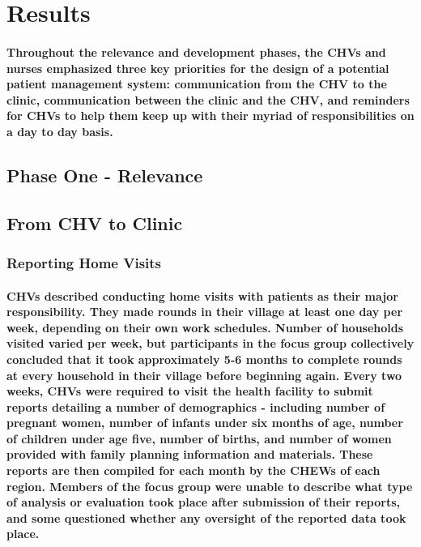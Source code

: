\section{Results}
\paragraph{Throughout the relevance and development phases, the CHVs and nurses emphasized three key priorities for the design of a potential patient management system: communication from the CHV to the clinic, communication between the clinic and the CHV, and reminders for CHVs to help them keep up with their myriad of responsibilities on a day to day basis.} 


\subsection{Phase One - Relevance}
\subsection{From CHV to Clinic}
\subsubsection{Reporting Home Visits}
\paragraph{CHVs described conducting home visits with patients as their major responsibility. They made rounds in their village at least one day per week, depending on their own work schedules. Number of households visited varied per week, but participants in the focus group collectively concluded that it took approximately 5-6 months to complete rounds at every household in their village before beginning again. Every two weeks, CHVs were required to visit the health facility to submit reports detailing a number of demographics - including number of pregnant women, number of infants under six months of age, number of children under age five, number of births, and number of women provided with family planning information and materials. These reports are then compiled for each month by the CHEWs of each region. Members of the focus group were unable to describe what type of analysis or evaluation took place after submission of their reports, and some questioned whether any oversight of the reported data took place.}

